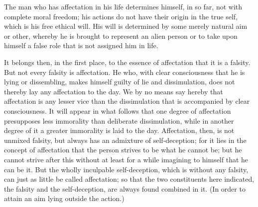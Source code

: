 \documentclass[12pt]{article}
\begin{document}
The man who has affectation in his life determines himself, in so far, not with complete moral freedom; his actions do not have their origin in the true self, which is his free ethical will. His will is determined by some merely natural aim or other, whereby he is brought to represent an alien person or to take upon himself a false role that is not assigned him in life.

It belongs then, in the first place, to the essence of affectation that it is a falsity. But not every falsity is affectation. He who, with clear consciousness that he is lying or dissembling, makes himself guilty of lie and dissimulation, does not thereby lay any affectation to the day. We by no means say hereby that affectation is any lesser vice than the dissimulation that is accompanied by clear consciousness. It will appear in what follows that one degree of affectation presupposes less immorality than deliberate dissimulation, while in another degree of it a greater immorality is laid to the day. Affectation, then, is not unmixed falsity, but always has an admixture of self-deception; for it lies in the concept of affectation that the person strives to be what he cannot be; but he cannot strive after this without at least for a while imagining to himself that he can be it. But the wholly inculpable self-deception, which is without any falsity, can just as little be called affectation; so that the two constituents here indicated, the falsity and the self-deception, are always found combined in it. (In order to attain an aim lying outside the action.)
\end{document}
